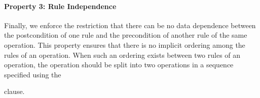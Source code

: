 %
%

\paragraph*{Property 3: Rule Independence}
Finally, we enforce the restriction that there can be no data dependence between
the postcondition of one rule and the precondition of another rule of the same
operation. This property ensures that there is no implicit ordering among the
rules of an operation. When such an ordering exists between two rules of an
operation, the operation should be split into two operations in a sequence
specified using the \subject{next} clause.

